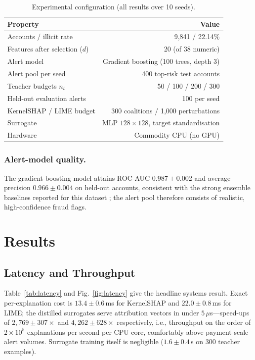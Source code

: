 \documentclass[runningheads]{llncs}
\begin{document}
\begin{table}[t]
\centering
\caption{Experimental configuration (all results over 10 seeds).}
\label{tab:setup}
\begin{tabular}{lr}
\toprule
Property & Value \\
\midrule
Accounts / illicit rate & 9{,}841 / 22.14\% \\
Features after selection ($d$) & 20 (of 38 numeric) \\
Alert model & Gradient boosting (100 trees, depth 3) \\
Alert pool per seed & 400 top-risk test accounts \\
Teacher budgets $n_t$ & 50 / 100 / 200 / 300 \\
Held-out evaluation alerts & 100 per seed \\
KernelSHAP / LIME budget & 300 coalitions / 1{,}000 perturbations \\
Surrogate & MLP $128{\times}128$, target standardisation \\
Hardware & Commodity CPU (no GPU) \\
\bottomrule
\end{tabular}
\end{table}

\subsubsection{Alert-model quality.}
The gradient-boosting model attains ROC-AUC $0.987 \pm 0.002$ and average
precision $0.966 \pm 0.004$ on held-out accounts, consistent with the
strong ensemble baselines reported for this dataset \cite{farrugia2020};
the alert pool therefore consists of realistic, high-confidence fraud
flags.

\section{Results}
\label{sec:results}

\subsection{Latency and Throughput}
Table~\ref{tab:latency} and Fig.~\ref{fig:latency} give the headline
systems result. Exact per-explanation cost is $13.4 \pm 0.6$\,ms for
KernelSHAP and $22.0 \pm 0.8$\,ms for LIME; the distilled surrogates serve
attribution vectors in under $5\,\mu$s---speed-ups of
$2{,}769 \pm 307\times$ and $4{,}262 \pm 628\times$
respectively, i.e., throughput on the order of $2\times10^{5}$
explanations per second per CPU core, comfortably above payment-scale
alert volumes. Surrogate training itself is negligible
($1.6 \pm 0.4$\,s on 300 teacher examples).
\end{document}
